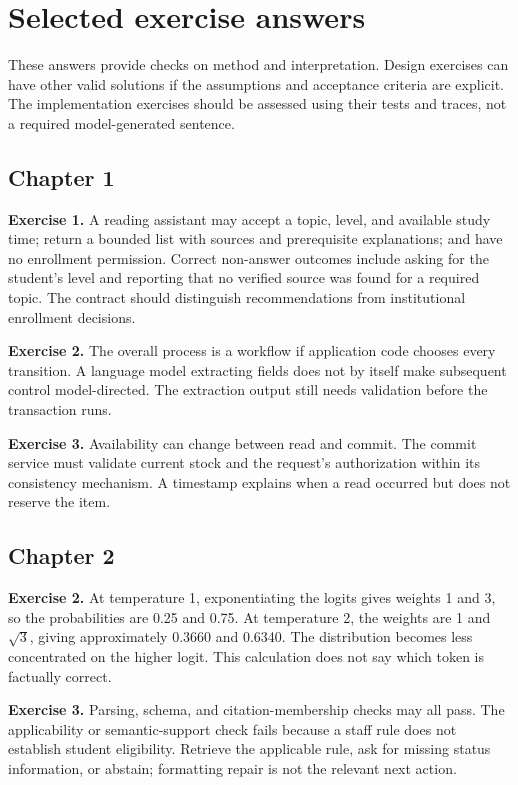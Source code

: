 \chapter{Selected exercise answers}
These answers provide checks on method and interpretation. Design exercises can have other valid solutions if the assumptions and acceptance criteria are explicit. The implementation exercises should be assessed using their tests and traces, not a required model-generated sentence.

\section{Chapter 1}
\textbf{Exercise 1.} A reading assistant may accept a topic, level, and available study time; return a bounded list with sources and prerequisite explanations; and have no enrollment permission. Correct non-answer outcomes include asking for the student's level and reporting that no verified source was found for a required topic. The contract should distinguish recommendations from institutional enrollment decisions.

\textbf{Exercise 2.} The overall process is a workflow if application code chooses every transition. A language model extracting fields does not by itself make subsequent control model-directed. The extraction output still needs validation before the transaction runs.

\textbf{Exercise 3.} Availability can change between read and commit. The commit service must validate current stock and the request's authorization within its consistency mechanism. A timestamp explains when a read occurred but does not reserve the item.

\section{Chapter 2}
\textbf{Exercise 2.} At temperature 1, exponentiating the logits gives weights 1 and 3, so the probabilities are 0.25 and 0.75. At temperature 2, the weights are 1 and \(\sqrt{3}\), giving approximately 0.3660 and 0.6340. The distribution becomes less concentrated on the higher logit. This calculation does not say which token is factually correct.

\textbf{Exercise 3.} Parsing, schema, and citation-membership checks may all pass. The applicability or semantic-support check fails because a staff rule does not establish student eligibility. Retrieve the applicable rule, ask for missing status information, or abstain; formatting repair is not the relevant next action.

